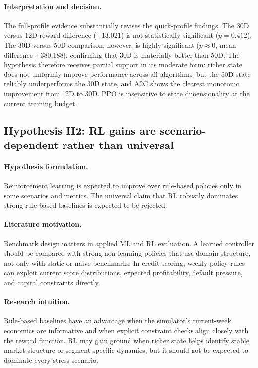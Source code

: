 \documentclass[12pt,a4paper]{article}
\begin{document}
\paragraph{Interpretation and decision.}
The full-profile evidence substantially revises the quick-profile findings. The 30D versus 12D reward difference (+13{,}021) is not statistically significant ($p = 0.412$). The 30D versus 50D comparison, however, is highly significant ($p \approx 0$, mean difference +380{,}188), confirming that 30D is materially better than 50D. The hypothesis therefore receives partial support in its moderate form: richer state does not uniformly improve performance across all algorithms, but the 50D state reliably underperforms the 30D state, and A2C shows the clearest monotonic improvement from 12D to 30D. PPO is insensitive to state dimensionality at the current training budget.

\subsection{Hypothesis H2: RL gains are scenario-dependent rather than universal}

\paragraph{Hypothesis formulation.}
Reinforcement learning is expected to improve over rule-based policies only in some scenarios and metrics. The universal claim that RL robustly dominates strong rule-based baselines is expected to be rejected.

\paragraph{Literature motivation.}
Benchmark design matters in applied ML and RL evaluation. A learned controller should be compared with strong non-learning policies that use domain structure, not only with static or naive benchmarks. In credit scoring, weekly policy rules can exploit current score distributions, expected profitability, default pressure, and capital constraints directly.

\paragraph{Research intuition.}
Rule-based baselines have an advantage when the simulator's current-week economics are informative and when explicit constraint checks align closely with the reward function. RL may gain ground when richer state helps identify stable market structure or segment-specific dynamics, but it should not be expected to dominate every stress scenario.
\end{document}

